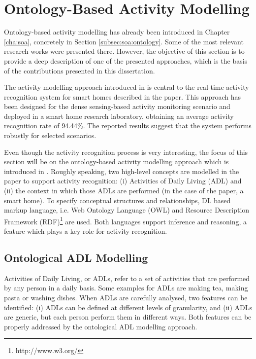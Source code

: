 \section{Ontology-Based Activity Modelling}
\label{sec:approach:ontology}

Ontology-based activity modelling has already been introduced in Chapter \ref{cha:soa}, concretely in Section \ref{subsec:soa:ontology}. Some of the most relevant research works were presented there. However, the objective of this section is to provide a deep description of one of the presented approaches, which is the basis of the contributions presented in this dissertation.

The activity modelling approach introduced in \cite{Chen2012a} is central to the real-time activity recognition system for smart homes described in the paper. This approach has been designed for the dense sensing-based activity monitoring scenario and deployed in a smart home research laboratory, obtaining an average activity recognition rate of 94.44\%. The reported results suggest that the system performs robustly for selected scenarios.

Even though the activity recognition process is very interesting, the focus of this section will be on the ontology-based activity modelling approach which is introduced in \cite{Chen2012a}. Roughly speaking, two high-level concepts are modelled in the paper to support activity recognition: (i) Activities of Daily Living (ADL) and (ii) the context in which those ADLs are performed (in the case of the paper, a smart home). To specify conceptual structures and relationships, DL based markup language, i.e. Web Ontology Language (OWL) and Resource Description Framework (RDF)\footnote{http://www.w3.org/} are used. Both languages support inference and reasoning, a feature which plays a key role for activity recognition. 

\subsection{Ontological ADL Modelling}
Activities of Daily Living, or ADLs, refer to a set of activities that are performed by any person in a daily basis. Some examples for ADLs are making tea, making pasta or washing dishes. When ADLs are carefully analysed, two features can be identified: (i) ADLs can be defined at different levels of granularity, and (ii) ADLs are generic, but each person perform them in different ways. Both features can be properly addressed by the ontological ADL modelling approach.

